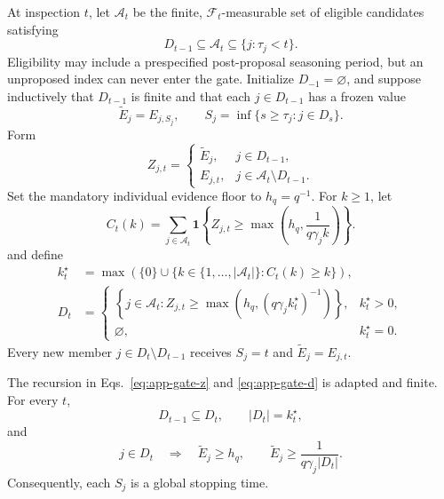 At inspection \(t\), let \(\mathcal A_t\) be the finite,
\(\mathcal F_t\)-measurable set of eligible candidates satisfying
\begin{equation}
 D_{t-1}\subseteq\mathcal A_t\subseteq\{j:\tau_j<t\}.
 \label{eq:app-eligibility}
\end{equation}
Eligibility may include a prespecified post-proposal seasoning period, but an
unproposed index can never enter the gate.  Initialize
\(D_{-1}=\varnothing\), and suppose
inductively that \(D_{t-1}\) is finite and that each \(j\in D_{t-1}\) has a
frozen value
\[
  \widetilde E_j=E_{j,S_j},\qquad
  S_j=\inf\{s\geq\tau_j:j\in D_s\}.
\]
Form
\begin{equation}
 Z_{j,t}=
 \begin{cases}
   \widetilde E_j,&j\in D_{t-1},\\
   E_{j,t},&j\in\mathcal A_t\setminus D_{t-1}.
 \end{cases}
 \label{eq:app-gate-z}
\end{equation}
Set the mandatory individual evidence floor to \(h_q=q^{-1}\).  For
\(k\geq1\), let
\begin{equation}
 C_t(k)=\sum_{j\in\mathcal A_t}
   \mathbf 1\!\left\{
     Z_{j,t}\geq\max\!\left(h_q,\frac{1}{q\gamma_jk}\right)\right\}.
 \label{eq:app-floor-count}
\end{equation}
and define
\begin{align}
 k_t^\star
 &=\max\left(\{0\}\cup
    \{k\in\{1,\ldots,|\mathcal A_t|\}:C_t(k)\geq k\}\right),
 \label{eq:app-gate-k}\\
 D_t
 &=
 \begin{cases}
 \left\{j\in\mathcal A_t:
 Z_{j,t}\geq\max\!\left(h_q,(q\gamma_jk_t^\star)^{-1}\right)\right\},
       &k_t^\star>0,\\
 \varnothing,&k_t^\star=0.
 \end{cases}
 \label{eq:app-gate-d}
\end{align}
Every new member \(j\in D_t\setminus D_{t-1}\) receives \(S_j=t\) and
\(\widetilde E_j=E_{j,t}\).

\begin{proposition}
\label{prop:app-gate}
The recursion in Eqs.~\eqref{eq:app-gate-z} and \eqref{eq:app-gate-d} is
adapted and finite.  For every \(t\),
\begin{equation}
  D_{t-1}\subseteq D_t,\qquad |D_t|=k_t^\star,
  \label{eq:app-nested-cardinality}
\end{equation}
and
\begin{equation}
  j\in D_t
  \quad\Longrightarrow\quad
  \widetilde E_j\geq h_q,\qquad
  \widetilde E_j\geq\frac{1}{q\gamma_j|D_t|}.
  \label{eq:app-self-consistency}
\end{equation}
Consequently, each \(S_j\) is a global stopping time.
\end{proposition}

